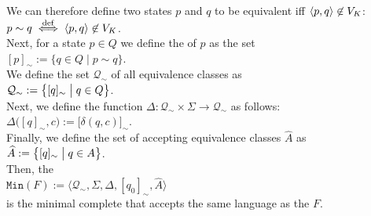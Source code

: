 We can therefore define two states $p$ and $q$ to be equivalent iff $\pair(p,q) \not\in V_K$:
\\[0.2cm]
\hspace*{1.3cm}
$p \sim q \; \stackrel{\mathrm{def}}{\Longleftrightarrow} \; \pair(p,q) \not\in V_K$.
\\[0.2cm]
Next, for a state $p \in Q$ we define the  of $p$ as the set
\\[0.2cm]
\hspace*{1.3cm}
$[p]_\sim := \{ q \in Q \mid p \sim q \}$.
\\[0.2cm]
We define the set $\mathcal{Q}_\sim$ of all equivalence classes as
\\[0.2cm]
\hspace*{1.3cm}
$\mathcal{Q}_\sim := \bigl\{ [q]_\sim \bigm| q \in Q \bigr\}$.
\\[0.2cm]
Next, we define the function $\Delta: \mathcal{Q}_\sim \times \Sigma \rightarrow \mathcal{Q}_\sim$ as follows:
\\[0.2cm]
\hspace*{1.3cm}
$\Delta\bigl([q]_\sim, c\bigr) := \bigl[ \delta(q, c) \bigr]_\sim$.
\\[0.2cm]
Finally, we define the set of accepting equivalence classes $\widehat{A}$ as
\\[0.2cm]
\hspace*{1.3cm}
$\widehat{A} := \bigl\{ [q]_\sim \bigm| q \in A \bigr\}$.
\\[0.2cm]
Then, the 
\\[0.2cm]
\hspace*{1.3cm}
$\mathtt{Min}(F) := \bigl\langle \mathcal{Q}_\sim, \Sigma, \Delta, [q_0]_\sim, \widehat{A} \bigr\rangle$
\\[0.2cm]
is the minimal complete  that accepts the same language as the  $F$.

